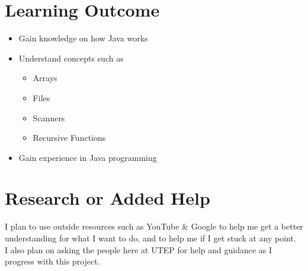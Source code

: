 \documentclass{article}
\begin{document}
	\section*{Learning Outcome}
		\begin{itemize}
			\item Gain knowledge on how Java works
			\item Understand concepts such as 
				\begin{itemize}
					\item Arrays
					\item Files
					\item Scanners
					\item Recursive Functions
				\end{itemize}
			\item Gain experience in Java programming
		\end{itemize}
	
	\section*{Research or Added Help}
		\hspace*{.5 in}I plan to use outside resources such as YouTube \& Google to help me get a better understanding for what I want to do, and to help me if I get stuck at any point. \\
		\hspace*{.5 in}I also plan on asking the people here at UTEP for help and guidance as I progress with this project.
\end{document}
